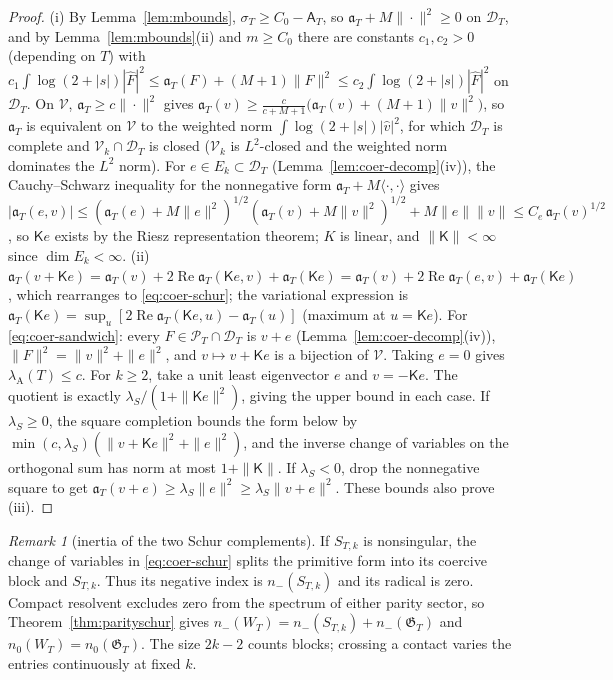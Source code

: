 \documentclass[10pt]{amsart}
\theoremstyle{definition}
\theoremstyle{remark}
\newtheorem{remark}[theorem]{Remark}
\newcommand{\Rel}{\operatorname{Re}}
\newcommand{\PT}{\mathcal P_T}
\newcommand{\lamA}{\lambda_{\mathrm A}(T)}
\newcommand{\Fh}{\widehat F}
\newcommand{\Aconst}{\mathsf A_T}
\begin{document}
\begin{proof}
(i) By Lemma~\ref{lem:mbounds}, $\sigma_T\ge C_0-\Aconst$, so $\mathfrak a_T+M\|\cdot\|^2\ge0$ on $\mathcal D_T$, and
by Lemma~\ref{lem:mbounds}(ii) and $m\ge C_0$ there are constants $c_1,c_2>0$ (depending on $T$) with
$c_1\int\log(2+|s|)|\Fh|^2\le\mathfrak a_T(F)+(M+1)\|F\|^2\le c_2\int\log(2+|s|)|\Fh|^2$ on $\mathcal D_T$. On $\mathcal V$,
$\mathfrak a_T\ge c\|\cdot\|^2$ gives $\mathfrak a_T(v)\ge\frac c{c+M+1}\big(\mathfrak a_T(v)+(M+1)\|v\|^2\big)$, so
$\mathfrak a_T$ is equivalent on $\mathcal V$ to the weighted norm $\int\log(2+|s|)|\widehat v|^2$, for which
$\mathcal D_T$ is complete and $\mathcal V_k\cap\mathcal D_T$ is closed ($\mathcal V_k$ is $L^2$-closed and the weighted norm
dominates the $L^2$ norm). For $e\in E_k\subset\mathcal D_T$ (Lemma~\ref{lem:coer-decomp}(iv)), the Cauchy--Schwarz
inequality for the nonnegative form $\mathfrak a_T+M\langle\cdot,\cdot\rangle$ gives
$|\mathfrak a_T(e,v)|\le(\mathfrak a_T(e)+M\|e\|^2)^{1/2}(\mathfrak a_T(v)+M\|v\|^2)^{1/2}+M\|e\|\|v\|\le C_e\,\mathfrak a_T(v)^{1/2}$,
so $\mathsf Ke$ exists by the Riesz representation theorem; $K$ is linear, and $\|\mathsf K\|<\infty$ since $\dim E_k<\infty$.
(ii) $\mathfrak a_T(v+\mathsf Ke)=\mathfrak a_T(v)+2\Rel\mathfrak a_T(\mathsf Ke,v)+\mathfrak a_T(\mathsf Ke)=\mathfrak a_T(v)+2\Rel\mathfrak a_T(e,v)+\mathfrak a_T(\mathsf Ke)$,
which rearranges to \eqref{eq:coer-schur}; the variational expression is $\mathfrak a_T(\mathsf Ke)=\sup_u[2\Rel\mathfrak a_T(\mathsf Ke,u)-\mathfrak a_T(u)]$
(maximum at $u=\mathsf Ke$). For \eqref{eq:coer-sandwich}: every $F\in\PT\cap\mathcal D_T$ is $v+e$ (Lemma~\ref{lem:coer-decomp}(iv)),
$\|F\|^2=\|v\|^2+\|e\|^2$, and $v\mapsto v+\mathsf Ke$ is a bijection of $\mathcal V$. Taking $e=0$ gives $\lamA\le c$. For $k\ge2$, take a unit least
eigenvector $e$ and $v=-\mathsf Ke$. The quotient is exactly
$\lambda_S/(1+\|\mathsf Ke\|^2)$, giving the upper bound in each case.
If $\lambda_S\ge0$, the square completion bounds the form below by
$\min(c,\lambda_S)(\|v+\mathsf Ke\|^2+\|e\|^2)$, and the inverse
change of variables on the orthogonal sum has norm at most $1+\|\mathsf K\|$.
If $\lambda_S<0$, drop the nonnegative square to get
$\mathfrak a_T(v+e)\ge\lambda_S\|e\|^2\ge\lambda_S\|v+e\|^2$.
These bounds also prove (iii).
\end{proof}

\begin{remark}[inertia of the two Schur complements]\label{rem:inertiatower}
If $S_{T,k}$ is nonsingular, the change of variables in
\eqref{eq:coer-schur} splits the primitive form into its coercive block
and $S_{T,k}$. Thus its negative index is $n_-(S_{T,k})$ and its radical
is zero. Compact resolvent excludes zero from the spectrum of either
parity sector, so Theorem~\ref{thm:parityschur} gives
$n_-(W_T)=n_-(S_{T,k})+n_-(\mathfrak G_T)$ and
$n_0(W_T)=n_0(\mathfrak G_T)$. The size $2k-2$ counts blocks;
crossing a contact varies the entries continuously at fixed $k$.
\end{remark}
\end{document}
